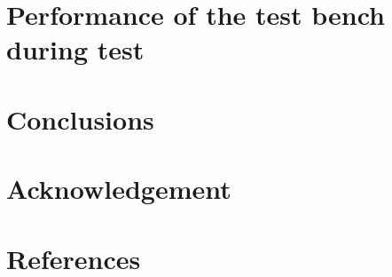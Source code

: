\documentclass[5p, times]{elsarticle}
\begin{document}
\section{Performance of the test bench during test}
\label{sec:performance}

\section{Conclusions}
\label{sec:conclustions}

\section*{Acknowledgement}

\appendix
\section{}
\label{app:}

\section*{References}

\end{document}

